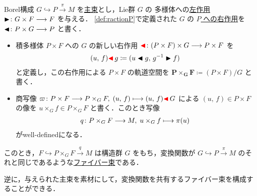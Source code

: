 \documentclass[TQFT_main]{subfiles}
\begin{document}
\begin{myprop}[label=prop:Borelconst]{Borel構成}
    $G \hookrightarrow P \xrightarrow{\pi} M$ を\hyperref[def.PFD]{主束}とし，Lie群 $G$ の \cinfty 多様体への\hyperref[def:Lie-action]{左作用} $\blacktriangleright \colon G \times F \longrightarrow F$ を与える．
    \eqref{def:ractionP}で定義された $G$ の \underline{$P$ への右作用}を $\blacktriangleleft \colon P \times G \longrightarrow P$ と書く．
    \begin{itemize}
        \item 積多様体 $P \times F$ への $G$ の新しい右作用 $\textcolor{red}{\blacktriangleleft} \colon (P \times F) \times G \longrightarrow P \times F$ を
        \begin{align}
            (u,\, f) \textcolor{red}{\blacktriangleleft}\, g \coloneqq (u \blacktriangleleft g,\, g^{-1} \blacktriangleright f)
        \end{align}
        と定義し，この右作用による $P \times F$ の軌道空間を $\bm{P \times_G F} \coloneqq (P \times F) / G$ と書く．
        \item 商写像 $\varpi\colon P \times F \longrightarrow P \times _G F,\; (u,\, f) \longmapsto (u,\, f) \textcolor{red}{\blacktriangleleft}\, G$ による $(u,\, f) \in P \times F$ の像を $u \times_G f \in P \times_G F$ と書く．このとき写像
        \begin{align}
            q \colon P \times_G F \longrightarrow M,\; u \times_G f \longmapsto \pi (u)
        \end{align}
        がwell-definedになる．
    \end{itemize}
    このとき，$F \hookrightarrow P \times_G F \xrightarrow{q} M$ は構造群 $G$ をもち，変換関数が $G \hookrightarrow P \xrightarrow{\pi} M$ のそれと同じであるような\hyperref[def.fiber-1]{ファイバー束}である．
\end{myprop}

逆に，与えられた主束を素材にして，変換関数を共有するファイバー束を構成することができる．
\end{document}
